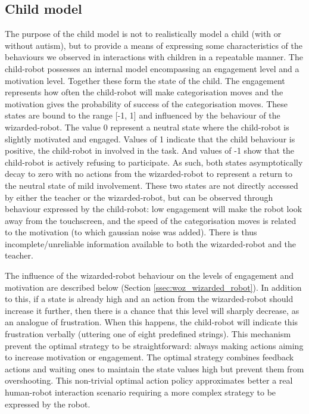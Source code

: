 \subsection{Child model} \label{ssec:woz_child}

The purpose of the child model is not to realistically model a child (with or without autism), but to provide a means of expressing some characteristics of the behaviours we observed in interactions with children in a repeatable manner. The child-robot possesses an internal model encompassing an engagement level and a motivation level. Together these form the state of the child. The engagement represents how often the child-robot will make categorisation moves and the motivation gives the probability of success of the categorisation moves. These states are bound to the range [-1, 1] and influenced by the behaviour of the wizarded-robot. The value 0 represent a neutral state where the child-robot is slightly motivated and engaged. Values of 1 indicate that the child behaviour is positive, the child-robot in involved in the task. And values of -1 show that the child-robot is actively refusing to participate. As such, both states asymptotically decay to zero with no actions from the wizarded-robot to represent a return to the neutral state of mild involvement. These two states are not directly accessed by either the teacher or the wizarded-robot, but can be observed through behaviour expressed by the child-robot: low engagement will make the robot look away from the touchscreen, and the speed of the categorisation moves is related to the motivation (to which gaussian noise was added). There is thus incomplete/unreliable information available to both the wizarded-robot and the teacher.

The influence of the wizarded-robot behaviour on the levels of engagement and motivation are described below (Section \ref{ssec:woz_wizarded_robot}). In addition to this, if a state is already high and an action from the wizarded-robot should increase it further, then there is a chance that this level will sharply decrease, as an analogue of frustration. When this happens, the child-robot will indicate this frustration verbally (uttering one of eight predefined strings). This mechanism prevent the optimal strategy to be straightforward: always making actions aiming to increase motivation or engagement. The optimal strategy combines feedback actions and waiting ones to maintain the state values high but prevent them from overshooting. This non-trivial optimal action policy approximates better a real human-robot interaction scenario requiring a more complex strategy to be expressed by the robot.

